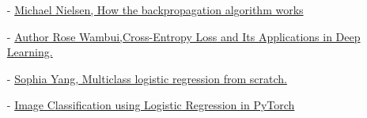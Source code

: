 \documentclass[english,notitlepage,reprint,nofootinbib]{revtex4-1}  %
\begin{document}
\begin{itemize}
    \item[-] \href{http://neuralnetworksanddeeplearning.com/chap2.html}{Michael Nielsen, How the backpropagation algorithm works} 
    \item[-] \href{https://neptune.ai/blog/cross-entropy-loss-and-its-applications-in-deep-learning}{Author Rose Wambui,Cross-Entropy Loss and Its Applications in Deep Learning.} 
    \item[-] \href{https://sophiamyang.github.io/DS/optimization/multiclass-logistic/multiclass-logistic.html}{Sophia Yang, Multiclass logistic regression from scratch.} 
    \item[-] \href{https://jovian.ai/attyuttam/03-logistic-regression}{Image Classification using Logistic Regression in PyTorch} 

\end{itemize}
%


\clearpage

\onecolumngrid



\end{document}

